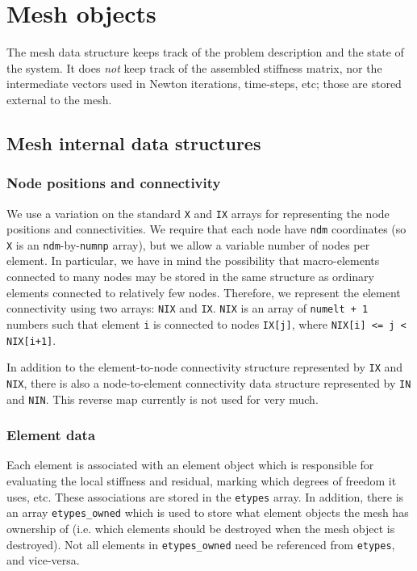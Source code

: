 \section{Mesh objects}

The mesh data structure keeps track of the problem description and
the state of the system.  It does {\em not} keep track of the
assembled stiffness matrix, nor the intermediate vectors used in
Newton iterations, time-steps, etc; those are stored external to
the mesh.


\subsection{Mesh internal data structures}


\subsubsection{Node positions and connectivity}

We use a variation on the standard {\tt X} and {\tt IX} arrays for
representing the node positions and connectivities.  We require
that each node have {\tt ndm} coordinates (so {\tt X} is an 
{\tt ndm}-by-{\tt numnp} array), but we allow a variable number of nodes
per element.  In particular, we have in mind the possibility that
macro-elements connected to many nodes may be stored in the same
structure as ordinary elements connected to relatively few nodes.
Therefore, we represent the element connectivity using two arrays:
{\tt NIX} and {\tt IX}.  {\tt NIX} is an array of {\tt numelt + 1}
numbers such that element {\tt i} is connected to nodes {\tt IX[j]},
where {\tt NIX[i] <= j < NIX[i+1]}.

In addition to the element-to-node connectivity structure
represented by {\tt IX} and {\tt NIX}, there is also a
node-to-element connectivity data structure represented by {\tt IN}
and {\tt NIN}.  This reverse map currently is not used for very much.


\subsubsection{Element data}

Each element is associated with an element object which is
responsible for evaluating the local stiffness and residual,
marking which degrees of freedom it uses, etc.  These associations
are stored in the {\tt etypes} array.  In addition, there is an
array {\tt etypes\_owned} which is used to store what element
objects the mesh has ownership of (i.e. which elements should be
destroyed when the mesh object is destroyed).  Not all elements in
{\tt etypes\_owned} need be referenced from {\tt etypes}, and
vice-versa.


